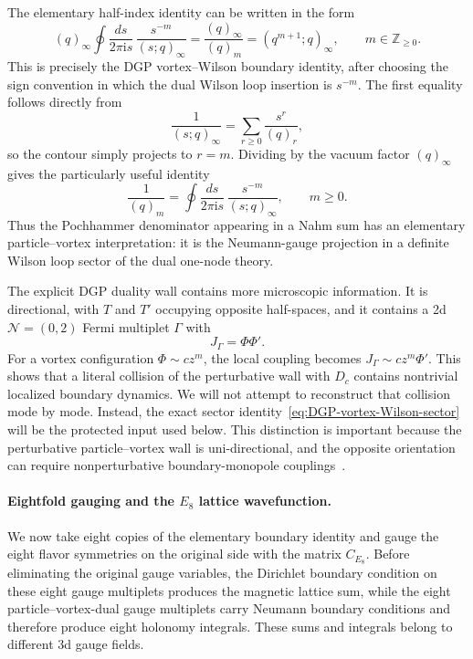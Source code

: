\documentclass[11pt,a4paper]{article}
\numberwithin{equation}{section}
\begin{document}
The elementary half-index identity can be written in the form
\begin{equation}
  (q)_\infty
  \oint\frac{ds}{2\pi \mathrm{i} s}\,
  \frac{s^{-m}}{(s;q)_\infty}
  =
  \frac{(q)_\infty}{(q)_m}
  =
  (q^{m+1};q)_\infty,
  \qquad m\in\mathbb Z_{\geq0}.
  \label{eq:DGP-vortex-Wilson-sector}
\end{equation}
This is precisely the DGP vortex--Wilson boundary identity, after choosing the sign convention in which the dual Wilson loop insertion is $s^{-m}$.  The first equality follows directly from
\begin{equation}
  \frac1{(s;q)_\infty}
  =\sum_{r\geq0}\frac{s^r}{(q)_r},
  \label{eq:DGP-one-node-q-binomial}
\end{equation}
so the contour simply projects to $r=m$.  Dividing by the vacuum factor $(q)_\infty$ gives the particularly useful identity
\begin{equation}
  \frac1{(q)_m}
  =
  \oint\frac{ds}{2\pi \mathrm{i} s}\,
  \frac{s^{-m}}{(s;q)_\infty},
  \qquad m\geq0.
  \label{eq:DGP-one-node-coefficient}
\end{equation}
Thus the Pochhammer denominator appearing in a Nahm sum has an elementary particle--vortex interpretation: it is the Neumann-gauge projection in a definite Wilson loop sector of the dual one-node theory.

The explicit DGP duality wall contains more microscopic information.  It is directional, with $T$ and $T'$ occupying opposite half-spaces, and it contains a 2d $\mathcal N=(0,2)$ Fermi multiplet $\Gamma$ with
\begin{equation}
  J_\Gamma=\Phi\Phi'.
  \label{eq:DGP-interface-J}
\end{equation}
For a vortex configuration $\Phi\sim c z^m$, the local coupling becomes $J_\Gamma\sim c z^m\Phi'$.  This shows that a literal collision of the perturbative wall with $D_c$ contains nontrivial localized boundary dynamics.  We will not attempt to reconstruct that collision mode by mode.  Instead, the exact sector identity~\eqref{eq:DGP-vortex-Wilson-sector} will be the protected input used below.  This distinction is important because the perturbative particle--vortex wall is uni-directional, and the opposite orientation can require nonperturbative boundary-monopole couplings~\cite{Dimofte:2017tpi}.

\paragraph{Eightfold gauging and the $E_8$ lattice wavefunction.}
We now take eight copies of the elementary boundary identity and gauge the eight flavor symmetries on the original side with the matrix $C_{E_8}$.  Before eliminating the original gauge variables, the Dirichlet boundary condition on these eight gauge multiplets produces the magnetic lattice sum, while the eight particle--vortex-dual gauge multiplets carry Neumann boundary conditions and therefore produce eight holonomy integrals.  These sums and integrals belong to different 3d gauge fields.
\end{document}
